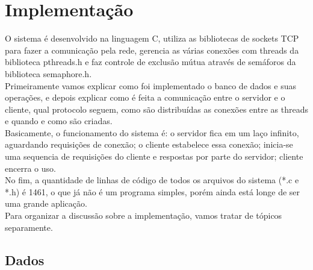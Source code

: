 \documentclass[11pt,twoside]{article}
\begin{document}
\section{Implementação}
O sistema é desenvolvido na linguagem C, utiliza as bibliotecas de sockets TCP para fazer a comunicação pela rede, gerencia as várias conexões com threads da biblioteca pthreads.h e faz controle de exclusão mútua através de semáforos da biblioteca semaphore.h.\\
Primeiramente vamos explicar como foi implementado o banco de dados e suas operações, e depois explicar como é feita a comunicação entre o servidor e o cliente, qual protocolo seguem, como são distribuídas as conexões entre as threads e quando e como são criadas.\\
Basicamente, o funcionamento do sistema é: o servidor fica em um laço infinito, aguardando requisições de conexão; o cliente estabelece essa conexão; inicia-se uma sequencia de requisições do cliente e respostas por parte do servidor; cliente encerra o uso.\\

No fim, a quantidade de linhas de código de todos os arquivos do sistema (*.c e *.h) é 1461, o que já não é um programa simples, porém ainda está longe de ser uma grande aplicação.\\

Para organizar a discussão sobre a implementação, vamos tratar de tópicos separamente.\\

\subsection{Dados}
\end{document}
